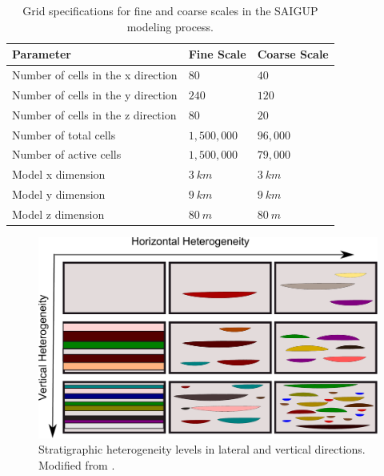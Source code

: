 \begin{table}[tbp]
  \centering
  \caption{Grid specifications for fine and coarse scales in the SAIGUP modeling process.}
  \label{tab:grids}
  \small
  \medskip\renewcommand{\arraystretch}{1.2}
  \begin{tabular}{|p{.35\linewidth}|p{.15\linewidth}|p{.15\linewidth}|}
    \hline
    Parameter &  Fine Scale& Coarse Scale\\ \hline
    Number of cells in the x direction & $80$&$40$\\%
    Number of cells in the y direction & $240$&$120$\\%
    Number of cells in the z direction & $80$&$20$\\%
    Number of total cells & $1,500,000$&$96,000$\\%
    Number of active cells& $1,500,000$&$79,000$\\%
	Model x dimension& $3~km$&$3~km$\\%
	Model y dimension& $9~km$&$9~km$\\%
	Model z dimension& $80~m$&$80~m$\\%
    \hline
  \end{tabular}\renewcommand{\arraystretch}{1}
\end{table}

\begin{figure}
\centering
\includegraphics[width=\linewidth]{./figurer/stratMatrix}
\caption{Stratigraphic heterogeneity levels in lateral and vertical directions. Modified from \cite{manzocchi2008sensitivity}.}
\label{fig:stratMat}
\end{figure}

